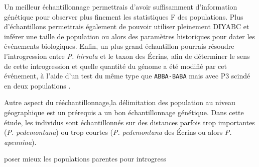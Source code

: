 Un meilleur échantillonnage permettrais d'avoir suffisamment d'information génétique pour observer plus finement les statistiques F des populations.
 Plus d'échantillons permettrais également de pouvoir utiliser pleinement DIYABC et inférer une taille de population ou alors des paramètres historiques pour dater les événements biologiques.
 Enfin, un plus grand échantillon pourrais résoudre l'introgression entre \textit{P. hirsuta} et le taxon des Écrins, afin de déterminer le sens de cette introgression et quelle quantité du génome a été modifié par cet événement, à l'aide d'un test du même type que \verb|ABBA-BABA| mais avec P3 scindé en deux populations \citep{Eaton2015}. 

Autre aspect du rééchantillonnage,la délimitation des population au niveau géographique est un prérequis a un bon échantillonnage génétique.
 Dans cette étude, les individus sont échantillonnés sur des distances parfois trop importantes (\textit{P. pedemontana}) ou trop courtes (\textit{P. pedemontana} des Écrins ou alors \textit{P. apennina}).

poser mieux les populations parentes pour introgress 
 
\fi
{}